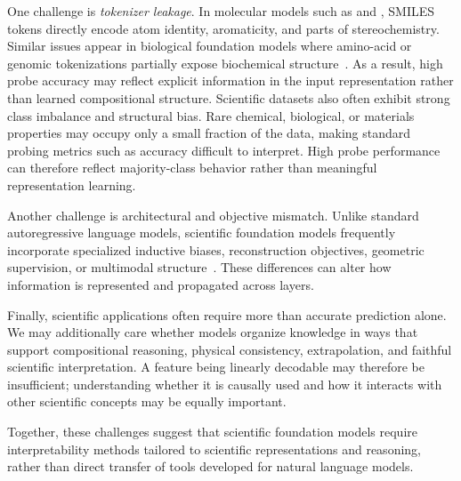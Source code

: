 One challenge is \emph{tokenizer leakage}. In molecular models such as \molm and \smi, SMILES tokens directly encode atom identity, aromaticity, and parts of stereochemistry. Similar issues appear in biological foundation models where amino-acid or genomic tokenizations partially expose biochemical structure~\cite{rives2021biological,lin2023evolutionary}. As a result, high probe accuracy may reflect explicit information in the input representation rather than learned compositional structure. Scientific datasets also often exhibit strong class imbalance and structural bias. Rare chemical, biological, or materials properties may occupy only a small fraction of the data, making standard probing metrics such as accuracy difficult to interpret. High probe performance can therefore reflect majority-class behavior rather than meaningful representation learning.

Another challenge is architectural and objective mismatch. Unlike standard autoregressive language models, scientific foundation models frequently incorporate specialized inductive biases, reconstruction objectives, geometric supervision, or multimodal structure~\cite{ross2022largescalechemicallanguagerepresentations,soares2024smi,jumper2021highly}. These differences can alter how information is represented and propagated across layers.

Finally, scientific applications often require more than accurate prediction alone. We may additionally care whether models organize knowledge in ways that support compositional reasoning, physical consistency, extrapolation, and faithful scientific interpretation. A feature being linearly decodable may therefore be insufficient; understanding whether it is causally used and how it interacts with other scientific concepts may be equally important.

Together, these challenges suggest that scientific foundation models require interpretability methods tailored to scientific representations and reasoning, rather than direct transfer of tools developed for natural language models.



